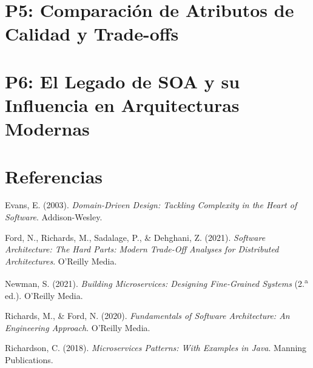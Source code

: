 \documentclass[11pt,a4paper]{article}
\begin{document}
\section{P5: Comparación de Atributos de Calidad y Trade-offs}

\section{P6: El Legado de SOA y su Influencia en Arquitecturas Modernas}



\section*{Referencias}

\noindent Evans, E. (2003). \emph{Domain-Driven Design: Tackling Complexity in
the Heart of Software}. Addison-Wesley.

\noindent Ford, N., Richards, M., Sadalage, P., \& Dehghani, Z. (2021).
\emph{Software Architecture: The Hard Parts: Modern Trade-Off Analyses for
Distributed Architectures}. O'Reilly Media.

\noindent Newman, S. (2021). \emph{Building Microservices: Designing
Fine-Grained Systems} (2.\textsuperscript{a} ed.). O'Reilly Media.

\noindent Richards, M., \& Ford, N. (2020). \emph{Fundamentals of Software
Architecture: An Engineering Approach}. O'Reilly Media.

\noindent Richardson, C. (2018). \emph{Microservices Patterns: With Examples
in Java}. Manning Publications.


\end{document}
